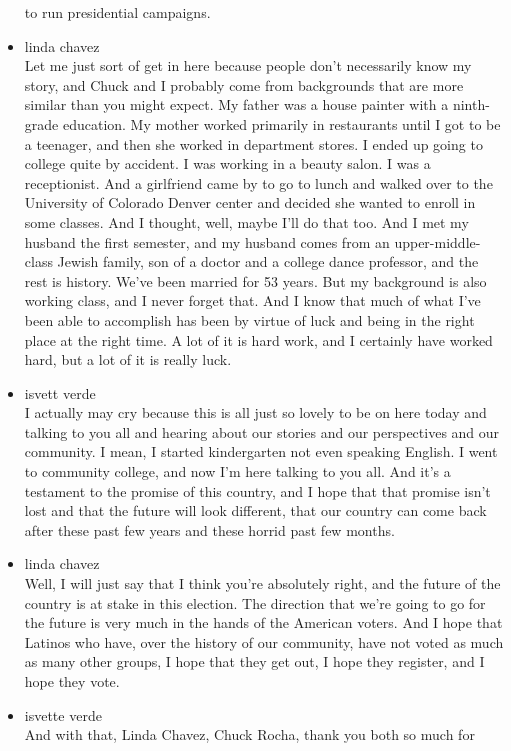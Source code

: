 \begin{itemize}
  to run presidential campaigns.
\item
  linda chavez\\
  Let me just sort of get in here because people don't necessarily know
  my story, and Chuck and I probably come from backgrounds that are more
  similar than you might expect. My father was a house painter with a
  ninth-grade education. My mother worked primarily in restaurants until
  I got to be a teenager, and then she worked in department stores. I
  ended up going to college quite by accident. I was working in a beauty
  salon. I was a receptionist. And a girlfriend came by to go to lunch
  and walked over to the University of Colorado Denver center and
  decided she wanted to enroll in some classes. And I thought, well,
  maybe I'll do that too. And I met my husband the first semester, and
  my husband comes from an upper-middle-class Jewish family, son of a
  doctor and a college dance professor, and the rest is history. We've
  been married for 53 years. But my background is also working class,
  and I never forget that. And I know that much of what I've been able
  to accomplish has been by virtue of luck and being in the right place
  at the right time. A lot of it is hard work, and I certainly have
  worked hard, but a lot of it is really luck.
\item
  isvett verde\\
  I actually may cry because this is all just so lovely to be on here
  today and talking to you all and hearing about our stories and our
  perspectives and our community. I mean, I started kindergarten not
  even speaking English. I went to community college, and now I'm here
  talking to you all. And it's a testament to the promise of this
  country, and I hope that that promise isn't lost and that the future
  will look different, that our country can come back after these past
  few years and these horrid past few months.
\item
  linda chavez\\
  Well, I will just say that I think you're absolutely right, and the
  future of the country is at stake in this election. The direction that
  we're going to go for the future is very much in the hands of the
  American voters. And I hope that Latinos who have, over the history of
  our community, have not voted as much as many other groups, I hope
  that they get out, I hope they register, and I hope they vote.
\item
  isvette verde\\
  And with that, Linda Chavez, Chuck Rocha, thank you both so much for

\end{itemize}
